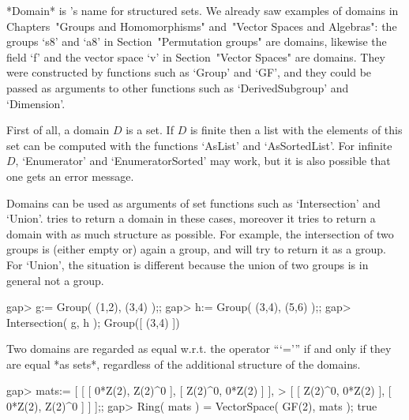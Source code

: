 


*Domain* is {\GAP}'s name for structured sets.
We already saw examples of domains in Chapters~"Groups and Homomorphisms"
and~"Vector Spaces and Algebras":
the groups `s8' and `a8' in Section~"Permutation groups" are domains,
likewise the field `f' and the vector space `v' in
Section~"Vector Spaces" are domains.
They were constructed by functions such as `Group' and `GF',
and they could be passed as arguments to other functions such as
`DerivedSubgroup' and `Dimension'.



First of all, a domain $D$ is a set.
If $D$ is finite then a list with the elements of this set can be
computed with the functions `AsList' and `AsSortedList'.
For infinite $D$, `Enumerator' and `EnumeratorSorted' may work,
but it is also possible that one gets an error message.

Domains can be used as arguments of set functions such as `Intersection'
and `Union'.
{\GAP} tries to return a domain in these cases,
moreover it tries to return a domain with as much structure as possible.
For example, the intersection of two groups is (either empty or) again a
group, and {\GAP} will try to return it as a group.
For `Union', the situation is different because the union of two groups
is in general not a group.

\beginexample
gap> g:= Group( (1,2), (3,4) );;
gap> h:= Group( (3,4), (5,6) );;
gap> Intersection( g, h );
Group([ (3,4) ])
\endexample

Two domains are regarded as equal w.r.t. the operator ```=''' if and only
if they are equal *as sets*, regardless of the additional structure of the
domains.

\beginexample
gap> mats:= [ [ [ 0*Z(2), Z(2)^0 ], [ Z(2)^0, 0*Z(2) ] ],
>             [ [ Z(2)^0, 0*Z(2) ], [ 0*Z(2), Z(2)^0 ] ] ];;
gap> Ring( mats ) = VectorSpace( GF(2), mats );
true
\endexample

